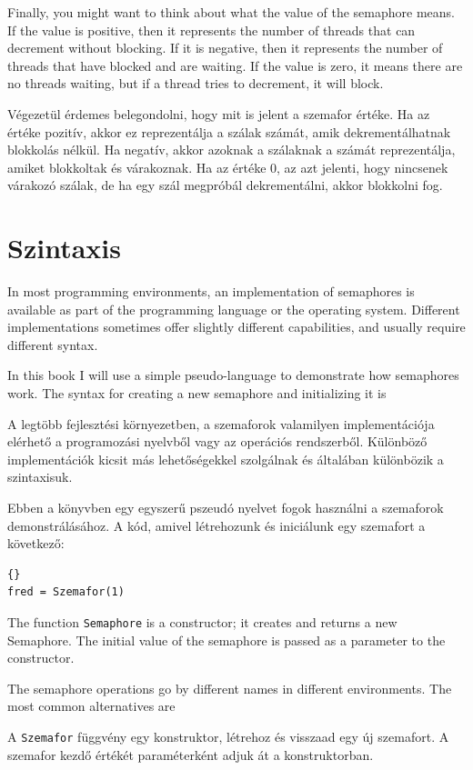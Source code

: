 \documentclass{book}
\begin{document}
Finally, you might want to think about what the value of the
semaphore means.  If the value is positive, then it represents the
number of threads that can decrement without blocking.  If it
is negative, then it represents the number of threads that have
blocked and are waiting.  If the value is zero, it means there
are no threads waiting, but if a thread tries to decrement, it
will block.

Végezetül érdemes belegondolni, hogy mit is jelent a szemafor értéke.
Ha az értéke pozitív, akkor ez reprezentálja a szálak számát, amik dekrementálhatnak
blokkolás nélkül. Ha negatív, akkor azoknak a szálaknak a számát reprezentálja,
amiket blokkoltak és várakoznak. Ha az értéke 0, az azt jelenti, hogy
nincsenek várakozó szálak, de ha egy szál megpróbál dekrementálni, akkor
blokkolni fog.

\section{Szintaxis}

In most programming environments, an implementation of semaphores is
available as part of the programming language or the operating system.
Different implementations sometimes offer slightly different
capabilities, and usually require different syntax.

In this book I will use a simple pseudo-language to demonstrate
how semaphores work.  The syntax for creating a new semaphore
and initializing it is

A legtöbb fejlesztési környezetben, a szemaforok valamilyen implementációja
elérhető a programozási nyelvből vagy az operációs rendszerből.
Különböző implementációk kicsit más lehetőségekkel szolgálnak
és általában különbözik a szintaxisuk.

Ebben a könyvben egy egyszerű
pszeudó nyelvet fogok használni a szemaforok demonstrálásához. A kód,
amivel létrehozunk és iniciálunk egy szemafort a következő:
%
\begin{lstlisting}[title={Szemafor inicializálás szintaxisa}]{}
fred = Szemafor(1)
\end{lstlisting}
%
The function {\tt Semaphore} is a constructor; it creates and
returns a new Semaphore.  The initial value of the semaphore
is passed as a parameter to the constructor.

The semaphore operations go by different names in different environments.
The most common alternatives are

A {\tt Szemafor} függvény egy konstruktor, létrehoz és visszaad egy új
szemafort. A szemafor kezdő értékét paraméterként adjuk át a
konstruktorban.
\end{document}
